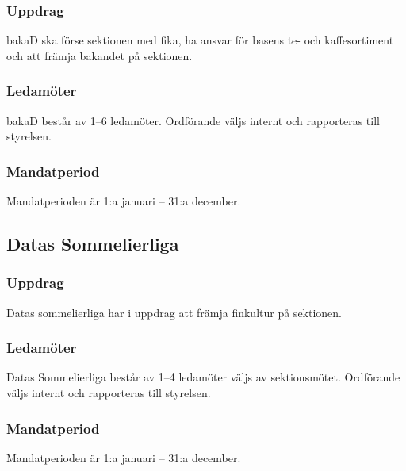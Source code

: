 \subsubsection{Uppdrag}
bakaD ska förse sektionen med fika, ha ansvar för basens te- och kaffesortiment och att främja bakandet på sektionen.
\subsubsection{Ledamöter}
bakaD består av 1--6 ledamöter. Ordförande väljs internt och rapporteras till styrelsen.
\subsubsection{Mandatperiod}
Mandatperioden är 1:a januari – 31:a december.

\subsection{Datas Sommelierliga}
\subsubsection{Uppdrag}
Datas sommelierliga har i uppdrag att främja finkultur på sektionen.
\subsubsection{Ledamöter}
Datas Sommelierliga består av 1--4 ledamöter väljs av sektionsmötet. Ordförande väljs internt och rapporteras till styrelsen.
\subsubsection{Mandatperiod}
Mandatperioden är 1:a januari – 31:a december.
\newpage
